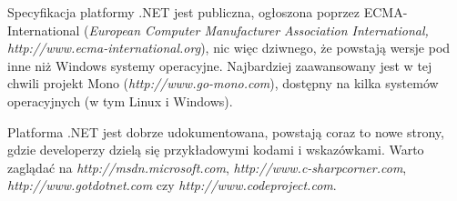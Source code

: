 Specyfikacja platformy .NET jest publiczna, ogłoszona poprzez ECMA-International ({\em European Computer
Manufacturer Association International, http://www.ecma-international.org}), nic więc dziwnego, że 
powstają wersje pod inne niż Windows systemy operacyjne. Najbardziej zaawansowany jest w tej chwili
projekt Mono ({\em http://www.go-mono.com}), dostępny na kilka systemów operacyjnych (w tym Linux i Windows).

Platforma .NET jest dobrze udokumentowana, powstają coraz to nowe strony, gdzie developerzy
dzielą się przykładowymi kodami i wskazówkami. Warto zaglądać na {\em http://msdn.microsoft.com},
{\em http://www.c-sharpcorner.com}, {\em http://www.gotdotnet.com} czy {\em http://www.codeproject.com}.